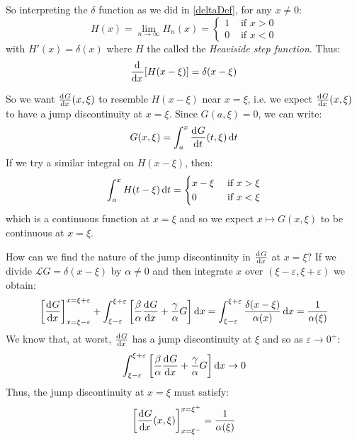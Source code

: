 \documentclass[../main.tex]{subfiles}
\begin{document}
So interpreting the $\delta$ function as we did in \cref{deltaDef}, for any $x \neq 0$:
\begin{equation}
  H(x) = \lim_{n \to \infty} H_n(x) = \begin{cases}
  1 & \text{ if } x > 0 \\
  0 & \text{ if } x< 0
  \end{cases} \label{heaviside}
\end{equation}
with $H'(x) = \delta(x)$ where $H$ the called the \textit{Heaviside step function}.
Thus:
\[
  \deriv{}{x}[H(x - \xi)] = \delta(x - \xi)
\]

So we want $\deriv{G}{x}(x, \xi)$ to resemble $H(x - \xi)$ near $x = \xi$, i.e. we expect $\deriv{G}{x}(x, \xi)$ to have a jump discontinuity at $x = \xi$.
Since $G(a, \xi) = 0$, we can write:
\[
  G(x, \xi) = \int_{a}^{x} \deriv{G}{t}(t, \xi) \d{t}
\]
If we try a similar integral on $H(x - \xi)$, then:
\[
  \int_{a}^{x} H(t - \xi) \d{t} = \begin{cases}
  x - \xi & \text{ if } x > \xi \\
  0 & \text{ if } x < \xi
  \end{cases}
\]
which is a continuous function at $x = \xi$ and so we expect $x \mapsto G(x, \xi)$ to be continuous at $x = \xi$.

How can we find the nature of the jump discontinuity in $\deriv{G}{x}$ at $x = \xi$?
If we divide $\mathcal{L} G = \delta(x - \xi)$ by $\alpha \neq 0$ and then integrate $x$ over $(\xi - \varepsilon, \xi + \varepsilon)$ we obtain:
\begin{align*}
  \eval{\deriv{G}{x}}{x = \xi - \varepsilon}{x = \xi + \varepsilon} + \int_{\xi - \varepsilon}^{\xi + \varepsilon} \left[\frac{\beta}{\alpha} \deriv{G}{x} + \frac{\gamma}{\alpha} G\right]\d{x} = \int_{\xi - \varepsilon}^{\xi + \varepsilon} \frac{\delta(x - \xi)}{\alpha(x)} \d{x} = \frac{1}{\alpha(\xi)}
\end{align*}
We know that, at worst, $\deriv{G}{x}$ has a jump discontinuity at $\xi$ and so as $\varepsilon \to 0^{+}$:
\[
   \int_{\xi - \varepsilon}^{\xi + \varepsilon} \left[\frac{\beta}{\alpha} \deriv{G}{x} + \frac{\gamma}{\alpha} G\right]\d{x} \to 0
\]
Thus, the jump discontinuity at $x = \xi$ must satisfy:
\[
  \eval{\deriv{G}{x}(x, \xi)}{x = \xi^{-}}{x = \xi^{+}} = \frac{1}{\alpha(\xi)}
\]
\end{document}
